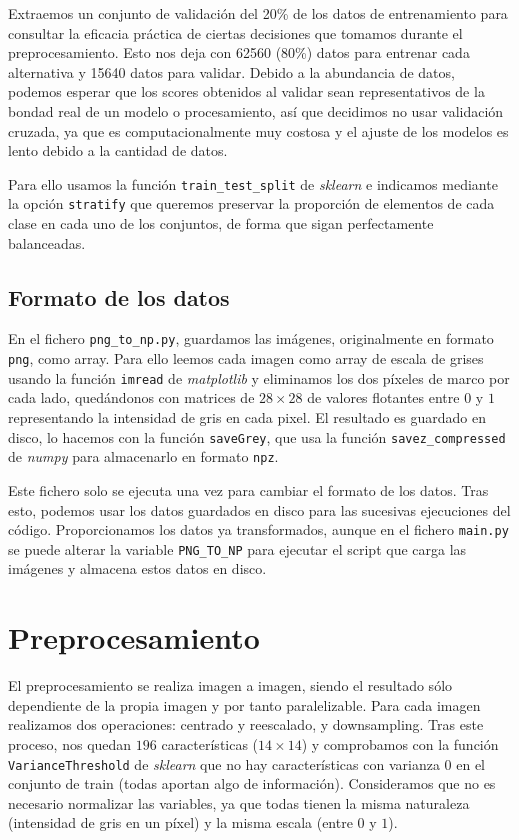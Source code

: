 \documentclass[a4]{article}
\begin{document}
Extraemos un conjunto de validación del 20\% de los datos de
entrenamiento para consultar la eficacia práctica de ciertas
decisiones que tomamos durante el preprocesamiento. Esto nos deja con
62560 (80\%) datos para entrenar cada alternativa y 15640 datos para
validar. Debido a la abundancia de datos, podemos esperar que los
scores obtenidos al validar sean representativos de la bondad real de
un modelo o procesamiento, así que decidimos no usar validación
cruzada, ya que es computacionalmente muy costosa y el ajuste de los
modelos es lento debido a la cantidad de datos.

Para ello usamos la función \texttt{train\_test\_split} de
\textit{sklearn} e indicamos mediante la opción \texttt{stratify} que
queremos preservar la proporción de elementos de cada clase en cada
uno de los conjuntos, de forma que sigan perfectamente balanceadas.

\subsection{Formato de los datos}

En el fichero \texttt{png\_to\_np.py}, guardamos las imágenes,
originalmente en formato \texttt{png}, como array. Para ello leemos
cada imagen como array de escala de grises usando la función
\texttt{imread} de \textit{matplotlib} y eliminamos los dos píxeles de
marco por cada lado, quedándonos con matrices de $28 \times 28$ de
valores flotantes entre $0$ y $1$ representando la intensidad de gris
en cada pixel. El resultado es guardado en disco, lo hacemos con la
función \texttt{saveGrey}, que usa la función
\texttt{savez\_compressed} de \textit{numpy} para almacenarlo en
formato \texttt{npz}.

Este fichero solo se ejecuta una vez para cambiar el formato de los
datos. Tras esto, podemos usar los datos guardados en disco para las
sucesivas ejecuciones del código. Proporcionamos los datos ya
transformados, aunque en el fichero \texttt{main.py} se puede alterar
la variable \texttt{PNG\_TO\_NP} para ejecutar el script que carga las
imágenes y almacena estos datos en disco.

\section{Preprocesamiento}


El preprocesamiento se realiza
imagen a imagen, siendo el resultado sólo dependiente de la propia
imagen y por tanto paralelizable. Para cada imagen realizamos dos operaciones: centrado y reescalado, y downsampling. Tras este proceso, nos quedan $196$ características ($14 \times 14$) y comprobamos con la función \texttt{VarianceThreshold} de \textit{sklearn} que no hay características con varianza $0$ en el conjunto de train (todas aportan algo de información). Consideramos que no es necesario normalizar las variables, ya que todas tienen la misma naturaleza (intensidad de gris en un píxel) y la misma escala (entre $0$ y $1$).
\end{document}
